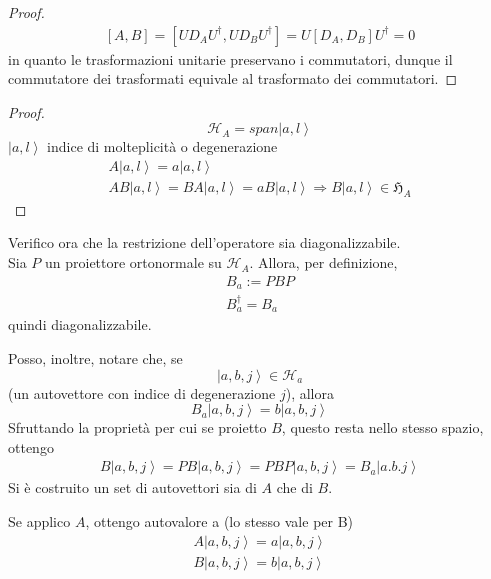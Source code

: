 \begin{proof}
\begin{equation*}\begin{split}
\left[A,B\right]=\left[UD_AU^{\dagger},UD_BU^{\dagger}\right]=U\left[D_A,D_B\right]U^{\dagger}=0
\end{split}\end{equation*}
in quanto le trasformazioni unitarie preservano i commutatori, dunque il commutatore dei trasformati equivale al trasformato dei commutatori.
\end{proof}

\begin{proof}
$$
\mathcal{H}_A=span{\left |a,l \right\rangle}
$$
$\left |a,l \right\rangle$ indice di molteplicità o degenerazione
\begin{equation*}\begin{split}
A\left |a,l \right\rangle=a\left |a,l \right\rangle \\
AB\left |a,l \right\rangle=BA\left |a,l \right\rangle=aB\left |a,l \right\rangle \Longrightarrow B\left |a,l \right\rangle \in \mathfrak{H}_A
\end{split}\end{equation*}
\end{proof}

Verifico ora che la restrizione dell'operatore sia diagonalizzabile.\\
Sia $P$ un proiettore ortonormale su $\mathcal{H}_A$.
Allora, per definizione,
\begin{equation*}\begin{split}
B_a:=PBP \\
B_a^{\dagger}=B_a
\end{split}\end{equation*}
quindi diagonalizzabile.

Posso, inoltre, notare che, se
$$
\left |a,b,j \right\rangle\in\mathcal{H}_a
$$
(un autovettore con indice di degenerazione $j$), allora
$$
B_a\left |a,b,j \right\rangle=b\left |a,b,j \right\rangle
$$
Sfruttando la proprietà per cui se proietto $B$, questo resta nello stesso spazio, ottengo
\begin{equation*}\begin{split}
B\left |a,b,j \right\rangle=PB\left |a,b,j \right\rangle=PBP\left |a,b,j \right\rangle=B_a\left |a.b.j \right\rangle
\end{split}\end{equation*}
Si è costruito un set di autovettori sia di $A$ che di $B$.

Se applico $A$, ottengo autovalore a (lo stesso vale per B)
\begin{equation*}\begin{split}
A\left |a,b,j \right\rangle=a\left |a,b,j \right\rangle \\
B\left |a,b,j \right\rangle=b\left |a,b,j \right\rangle
\end{split}\end{equation*}

